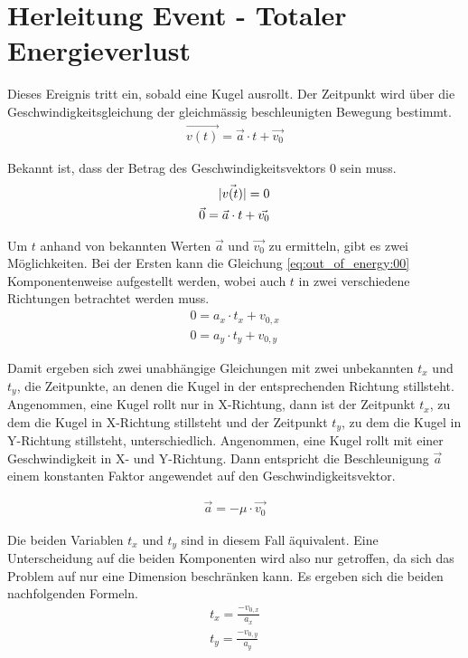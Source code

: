 \section{Herleitung Event - Totaler Energieverlust}\label{anhang:herleitung:event:outOfEnergy}

Dieses Ereignis tritt ein, sobald eine Kugel ausrollt. Der Zeitpunkt wird über die Geschwindigkeitsgleichung der
gleichmässig beschleunigten Bewegung bestimmt.
\begin{align}
    \vec{v(t)} = \vec{a} \cdot t + \vec{v_0}
\end{align}

Bekannt ist, dass der Betrag des Geschwindigkeitsvektors $0$ sein muss.
\begin{align}
    \lvert \vec{v(t)} \rvert = 0\\
    \vec{0} = \vec{a} \cdot t + \vec{v_0}\label{eq:out_of_energy:00}
\end{align}

Um $t$ anhand von bekannten Werten $\vec{a}$ und $\vec{v_0}$ zu ermitteln, gibt es zwei Möglichkeiten. Bei der Ersten
kann die Gleichung \ref{eq:out_of_energy:00} Komponentenweise aufgestellt werden, wobei auch $t$ in zwei verschiedene
Richtungen betrachtet werden muss.
\begin{align}
    0 = a_x \cdot t_x + v_{0,x}\\
    0 = a_y \cdot t_y + v_{0,y}
\end{align}

Damit ergeben sich zwei unabhängige Gleichungen mit zwei unbekannten $t_x$ und $t_y$, die Zeitpunkte, an denen die Kugel in der
entsprechenden Richtung stillsteht.
Angenommen, eine Kugel rollt nur in X-Richtung, dann ist der Zeitpunkt $t_x$, zu dem die Kugel in X-Richtung stillsteht
und der Zeitpunkt $t_y$, zu dem die Kugel in Y-Richtung stillsteht, unterschiedlich.
Angenommen, eine Kugel rollt mit einer Geschwindigkeit in X- und Y-Richtung. Dann entspricht die Beschleunigung $\vec{a}$
einem konstanten Faktor angewendet auf den Geschwindigkeitsvektor.

\begin{align}
    \vec{a} = -\mu \cdot \vec{v_0}
\end{align}

Die beiden Variablen $t_x$ und $t_y$ sind in diesem Fall äquivalent. Eine Unterscheidung auf die beiden Komponenten wird
also nur getroffen, da sich das Problem auf nur eine Dimension beschränken kann. Es ergeben sich die beiden nachfolgenden
Formeln.
\begin{align}
    t_x = \frac{-v_{0,x}}{a_x}\\
    t_y = \frac{-v_{0,y}}{a_y}
\end{align}

